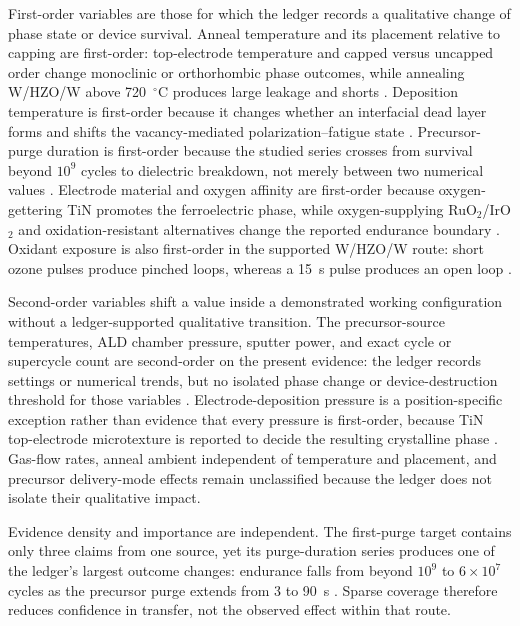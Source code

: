 \documentclass[11pt,a4paper]{report}
\begin{document}
First-order variables are those for which the ledger records a qualitative change of phase state or device survival. Anneal temperature and its placement relative to capping are first-order: top-electrode temperature and capped versus uncapped order change monoclinic or orthorhombic phase outcomes, while annealing W/HZO/W above 720~$^\circ$C produces large leakage and shorts \cite{kim2020tin,zhang2015inductive,kashir2021wake}. Deposition temperature is first-order because it changes whether an interfacial dead layer forms and shifts the vacancy-mediated polarization--fatigue state \cite{choi2022chamber}. Precursor-purge duration is first-order because the studied series crosses from survival beyond $10^9$ cycles to dielectric breakdown, not merely between two numerical values \cite{choi2025purge}. Electrode material and oxygen affinity are first-order because oxygen-gettering TiN promotes the ferroelectric phase, while oxygen-supplying RuO$_2$/IrO$_2$ and oxidation-resistant alternatives change the reported endurance boundary \cite{silva2023road,liao2023postmoore,kim2020tin}. Oxidant exposure is also first-order in the supported W/HZO/W route: short ozone pulses produce pinched loops, whereas a 15~s pulse produces an open loop \cite{kashir2021wake}.

Second-order variables shift a value inside a demonstrated working configuration without a ledger-supported qualitative transition. The precursor-source temperatures, ALD chamber pressure, sputter power, and exact cycle or supercycle count are second-order on the present evidence: the ledger records settings or numerical trends, but no isolated phase change or device-destruction threshold for those variables \cite{choi2022chamber,choi2025purge,kashir2021wake}. Electrode-deposition pressure is a position-specific exception rather than evidence that every pressure is first-order, because TiN top-electrode microtexture is reported to decide the resulting crystalline phase \cite{silva2023road}. Gas-flow rates, anneal ambient independent of temperature and placement, and precursor delivery-mode effects remain unclassified because the ledger does not isolate their qualitative impact.

Evidence density and importance are independent. The first-purge target contains only three claims from one source, yet its purge-duration series produces one of the ledger's largest outcome changes: endurance falls from beyond $10^9$ to $6\times10^7$ cycles as the precursor purge extends from 3 to 90~s \cite{choi2025purge}. Sparse coverage therefore reduces confidence in transfer, not the observed effect within that route.
\end{document}
